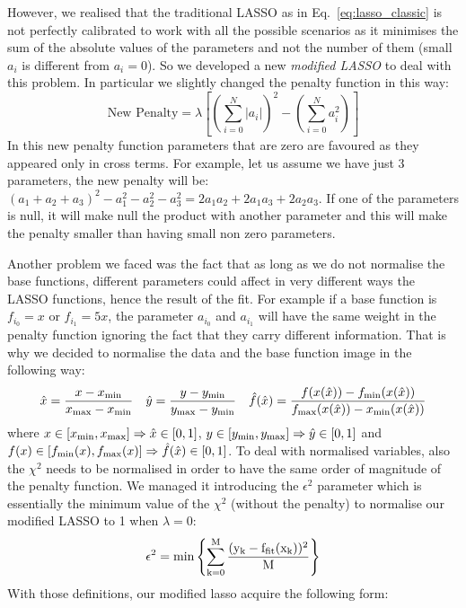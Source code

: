 \documentclass[11pt]{article}
\begin{document}
However, we realised that the traditional LASSO as in Eq.~\ref{eq:lasso_classic} is not perfectly calibrated to work with all the possible scenarios as it minimises the sum of the absolute values of the parameters and not the number of them (small $a_i$ is different from $a_i=0$). So we developed a new \textit{modified LASSO} to deal with this problem. In particular we slightly changed the penalty function in this way:
%
\begin{equation}
\label{eq:new_penalty}
\text{New Penalty} = \lambda \left[ \left( \sum_{i=0}^N \lvert a_i \rvert \right)^2 - \left(\sum_{i=0}^N a_i^2\right)\right]
\end{equation}
%
In this new penalty function parameters that are zero are favoured as they appeared only in cross terms. For example, let us assume we have just 3 parameters, the new penalty will be: $(a_1 + a_2 + a_3)^2 - a_1^2 -a_2^2 - a_3^2 = 2 a_1a_2 + 2 a_1a_3 +2a_2a_3$. If one of the parameters is null, it will make null the product with another parameter and this will make the penalty smaller than having small non zero parameters. 

Another problem we faced was the fact that as long as we do not normalise the base functions, different parameters could affect in very different ways the LASSO functions, hence the result of the fit. For example if a base function is $f_{i_0} = x$ or $f_{i_1} = 5x$, the parameter $a_{i_0}$ and $a_{i_1}$ will have the same weight in the penalty function ignoring the fact that they carry different information. That is why we decided to normalise the data and the base function image in the following way:
\begin{equation}
\hat x = \frac{x - x_{\rm{min}}}{x_{\rm{max}}-x_{\rm{min}}} \quad
\hat y = \frac{y - y_{\rm{min}}}{y_{\rm{max}}-y_{\rm{min}}} \quad
\hat f(\hat x) = \frac{f(x(\hat x)) - f_{\rm{min}}(x(\hat x))}{f_{\rm{max}}(x(\hat x))-x_{\rm{min}}(x(\hat x))}
\end{equation}
%
where $x \in [x_{\rm{min}},x_{\rm{max}}] \Rightarrow \hat x \in [0,1]$, $y \in [y_{\rm{min}},y_{\rm{max}}] \Rightarrow \hat y \in [0,1]$ and $f(x) \in [f_{\rm{min}}(x),f_{\rm{max}}(x)] \Rightarrow \hat f (\hat x) \in [0,1]$.
%
To deal with normalised variables, also the $\chi^2$ needs to be normalised in order to have the same order of magnitude of the penalty function. We managed it introducing the $\epsilon^2$ parameter which is essentially the minimum value of the $\chi^2$ (without the penalty) to normalise our modified LASSO to 1 when $\lambda =0$:
%
\begin{equation}
\epsilon^2 = \rm{min}\left\lbrace \sum_{k=0}^M\frac{(y_k - f_{\rm{fit}}(x_k))^2}{M}
 \right\rbrace
\end{equation}
%
With those definitions, our modified lasso acquire the following form:
\end{document}
